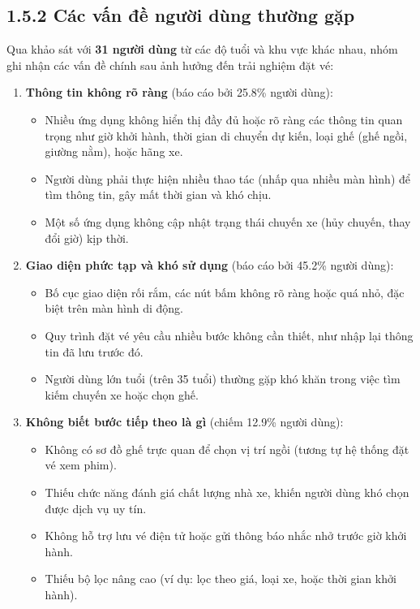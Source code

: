 \subsection*{1.5.2 Các vấn đề người dùng thường gặp}
Qua khảo sát với \textbf{31 người dùng} từ các độ tuổi và khu vực khác nhau, nhóm ghi nhận các vấn đề chính sau ảnh hưởng đến trải nghiệm đặt vé:
\begin{enumerate}
    \item \textbf{Thông tin không rõ ràng} (báo cáo bởi 25.8\% người dùng):
    \begin{itemize}
        \item Nhiều ứng dụng không hiển thị đầy đủ hoặc rõ ràng các thông tin quan trọng như giờ khởi hành, thời gian di chuyển dự kiến, loại ghế (ghế ngồi, giường nằm), hoặc hãng xe.
        \item Người dùng phải thực hiện nhiều thao tác (nhấp qua nhiều màn hình) để tìm thông tin, gây mất thời gian và khó chịu.
        \item Một số ứng dụng không cập nhật trạng thái chuyến xe (hủy chuyến, thay đổi giờ) kịp thời.
    \end{itemize}
    \item \textbf{Giao diện phức tạp và khó sử dụng} (báo cáo bởi 45.2\% người dùng):
    \begin{itemize}
        \item Bố cục giao diện rối rắm, các nút bấm không rõ ràng hoặc quá nhỏ, đặc biệt trên màn hình di động.
        \item Quy trình đặt vé yêu cầu nhiều bước không cần thiết, như nhập lại thông tin đã lưu trước đó.
        \item Người dùng lớn tuổi (trên 35 tuổi) thường gặp khó khăn trong việc tìm kiếm chuyến xe hoặc chọn ghế.
    \end{itemize}
    \item \textbf{Không biết bước tiếp theo là gì} (chiếm 12.9\% người dùng):
    \begin{itemize}
        \item Không có sơ đồ ghế trực quan để chọn vị trí ngồi (tương tự hệ thống đặt vé xem phim).
        \item Thiếu chức năng đánh giá chất lượng nhà xe, khiến người dùng khó chọn được dịch vụ uy tín.
        \item Không hỗ trợ lưu vé điện tử hoặc gửi thông báo nhắc nhở trước giờ khởi hành.
        \item Thiếu bộ lọc nâng cao (ví dụ: lọc theo giá, loại xe, hoặc thời gian khởi hành).
    \end{itemize}
\end{enumerate}


